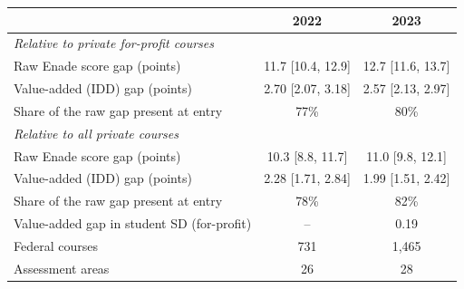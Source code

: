 \begin{tabular}{lcc}
\toprule
 & 2022 & 2023 \\
\midrule
\multicolumn{3}{l}{\textit{Relative to private for-profit courses}} \\
Raw Enade score gap (points) & 11.7 [10.4, 12.9] & 12.7 [11.6, 13.7] \\
Value-added (IDD) gap (points) & 2.70 [2.07, 3.18] & 2.57 [2.13, 2.97] \\
Share of the raw gap present at entry & 77\% & 80\% \\
\midrule
\multicolumn{3}{l}{\textit{Relative to all private courses}} \\
Raw Enade score gap (points) & 10.3 [8.8, 11.7] & 11.0 [9.8, 12.1] \\
Value-added (IDD) gap (points) & 2.28 [1.71, 2.84] & 1.99 [1.51, 2.42] \\
Share of the raw gap present at entry & 78\% & 82\% \\
\midrule
Value-added gap in student SD (for-profit) & -- & 0.19 \\
Federal courses & 731 & 1{,}465 \\
Assessment areas & 26 & 28 \\
\bottomrule
\end{tabular}